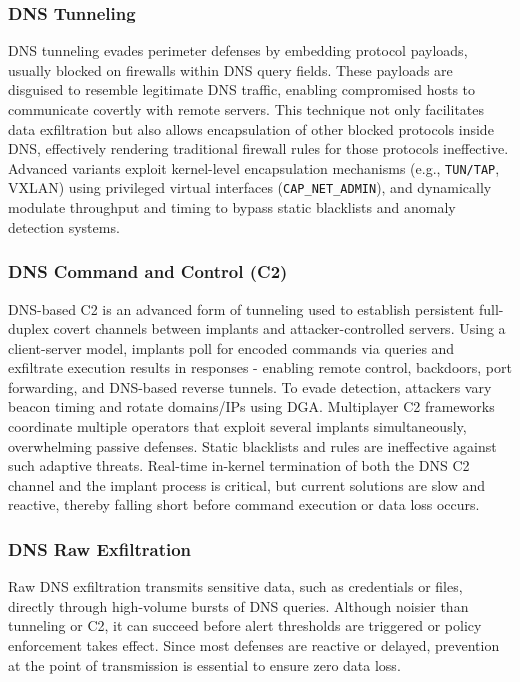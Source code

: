 \documentclass [11pt, proquest] {uwthesis}[2020/02/24]
\begin{document}
\subsubsection*{DNS Tunneling}
DNS tunneling evades perimeter defenses by embedding protocol payloads, usually blocked on firewalls within DNS query fields. These payloads are disguised to resemble legitimate DNS traffic, enabling compromised hosts to communicate covertly with remote servers. This technique not only facilitates data exfiltration but also allows encapsulation of other blocked protocols inside DNS, effectively rendering traditional firewall rules for those protocols ineffective. Advanced variants exploit kernel-level encapsulation mechanisms (e.g., \texttt{TUN/TAP}, VXLAN) using privileged virtual interfaces (\texttt{CAP\_NET\_ADMIN}), and dynamically modulate throughput and timing to bypass static blacklists and anomaly detection systems.

\subsubsection*{DNS Command and Control (C2)}
DNS-based C2 is an advanced form of tunneling used to establish persistent full-duplex covert channels between implants and attacker-controlled servers. Using a client-server model, implants poll for encoded commands via queries and exfiltrate execution results in responses - enabling remote control, backdoors, port forwarding, and DNS-based reverse tunnels. To evade detection, attackers vary beacon timing and rotate domains/IPs using DGA. Multiplayer C2 frameworks coordinate multiple operators that exploit several implants simultaneously, overwhelming passive defenses. Static blacklists and rules are ineffective against such adaptive threats. Real-time in-kernel termination of both the DNS C2 channel and the implant process is critical, but current solutions are slow and reactive, thereby falling short before command execution or data loss occurs.

\subsubsection*{DNS Raw Exfiltration}
Raw DNS exfiltration transmits sensitive data, such as credentials or files, directly through high-volume bursts of DNS queries. Although noisier than tunneling or C2, it can succeed before alert thresholds are triggered or policy enforcement takes effect. Since most defenses are reactive or delayed, prevention at the point of transmission is essential to ensure zero data loss.
\end{document}
